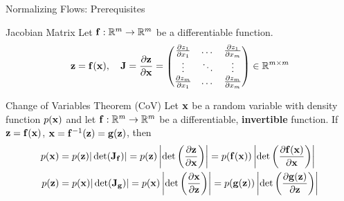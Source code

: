 \documentclass{beamer}
\begin{document}
\begin{frame}{Normalizing Flows: Prerequisites}
	\begin{block}{Jacobian Matrix}
		Let $\mathbf{f}: \mathbb{R}^m \rightarrow \mathbb{R}^m$ be a differentiable function.
		\[
			\mathbf{z} = \mathbf{f}(\mathbf{x}), \quad 
			\mathbf{J} =  \frac{\partial \mathbf{z}}{\partial \mathbf{x}} =
			\begin{pmatrix}
				\frac{\partial z_1}{\partial x_1} & \dots & \frac{\partial z_1}{\partial x_m} \\
				\vdots & \ddots & \vdots \\ 
				\frac{\partial z_m}{\partial x_1} & \dots & \frac{\partial z_m}{\partial x_m}
			\end{pmatrix} \in \mathbb{R}^{m \times m}
		\]
		\vspace{-0.3cm}
	\end{block}
	\begin{block}{Change of Variables Theorem (CoV)}
		Let $\mathbf{x}$ be a random variable with density function $p(\mathbf{x})$ and let $\mathbf{f}: \mathbb{R}^m \rightarrow \mathbb{R}^m$ be a differentiable, \textbf{invertible} function. If $\mathbf{z} = \mathbf{f}(\mathbf{x})$, $\mathbf{x} = \mathbf{f}^{-1}(\mathbf{z}) = \mathbf{g}(\mathbf{z})$, then
		\begin{align*}
			p(\mathbf{x}) &= p(\mathbf{z}) |\det(\mathbf{J}_{\mathbf{f}})| = p(\mathbf{z}) \left|\det \left( \frac{\partial \mathbf{z}}{\partial \mathbf{x}} \right) \right| = p(\mathbf{f}(\mathbf{x})) \left|\det \left(  \frac{\partial \mathbf{f}(\mathbf{x})}{\partial \mathbf{x}} \right) \right| \\
			p(\mathbf{z}) &= p(\mathbf{x}) |\det(\mathbf{J}_{\mathbf{g}})|= p(\mathbf{x}) \left|\det \left(  \frac{\partial \mathbf{x}}{\partial \mathbf{z}} \right) \right| = p(\mathbf{g}(\mathbf{z})) \left|\det \left(  \frac{\partial \mathbf{g}(\mathbf{z})}{\partial \mathbf{z}} \right) \right|
		\end{align*}
		\vspace{-0.5cm}
	\end{block}
\end{frame}
\end{document}
